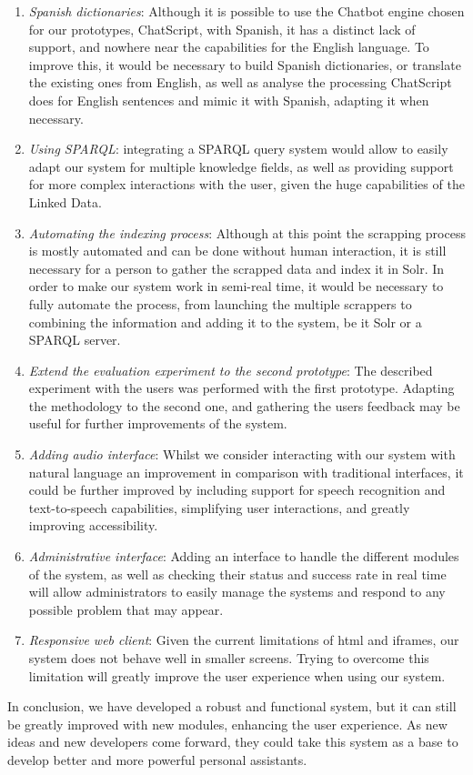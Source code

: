 \begin{enumerate}
 \item \emph{Spanish dictionaries}: Although it is possible to use the Chatbot engine chosen for our prototypes, ChatScript, with Spanish, it has a distinct lack of support, and nowhere near the capabilities for the English language. To improve this, it would be necessary to build Spanish dictionaries, or translate the existing ones from English, as well as analyse the processing ChatScript does for English sentences and mimic it with Spanish, adapting it when necessary.
 \item \emph{Using SPARQL}: integrating a SPARQL query system would allow to easily adapt our system for multiple knowledge fields, as well as providing support for more complex interactions with the user, given the huge capabilities of the Linked Data.
 \item \emph{Automating the indexing process}: Although at this point the scrapping process is mostly automated and can be done without human interaction, it is still necessary for a person to gather the scrapped data and index it in Solr. In order to make our system work in semi-real time, it would be necessary to fully automate the process, from launching the multiple scrappers to combining the information and adding it to the system, be it Solr or a SPARQL server.
 \item \emph{Extend the evaluation experiment to the second prototype}: The described experiment with the users was performed with the first prototype. Adapting the methodology to the second one, and gathering the users feedback may be useful for further improvements of the system.
 \item \emph{Adding audio interface}: Whilst we consider interacting with our system with natural language an improvement in comparison with traditional interfaces, it could be further improved by including support for speech recognition and text-to-speech capabilities, simplifying user interactions, and greatly improving accessibility.
 \item \emph{Administrative interface}: Adding an interface to handle the different modules of the system, as well as checking their status and success rate in real time will allow administrators to easily manage the systems and respond to any possible problem that may appear.
 \item \emph{Responsive web client}: Given the current limitations of html and iframes, our system does not behave well in smaller screens. Trying to overcome this limitation will greatly improve the user experience when using our system.
\end{enumerate}

In conclusion, we have developed a robust and functional system, but it can still be greatly improved with new modules, enhancing the user experience. As new ideas and new developers come forward, they could take this system as a base to develop better and more powerful personal assistants.